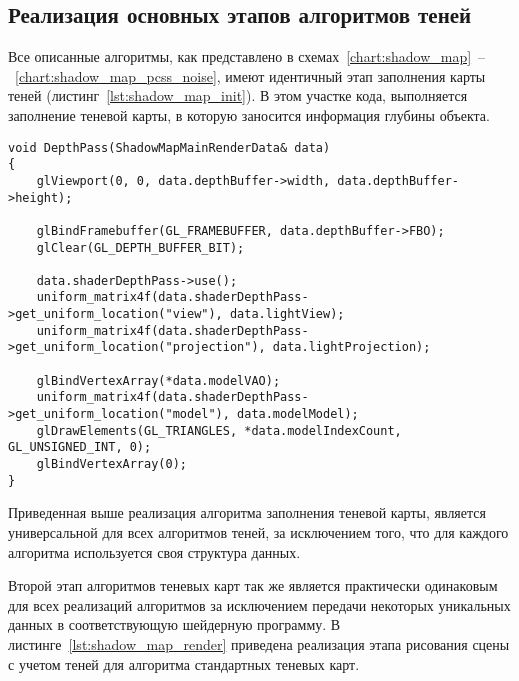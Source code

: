 \subsection{Реализация основных этапов алгоритмов теней}

Все описанные алгоритмы, как представлено в
схемах~\ref{chart:shadow_map}~--~\ref{chart:shadow_map_pcss_noise},
имеют идентичный этап заполнения карты теней (листинг~\ref{lst:shadow_map_init}).
В этом участке кода, выполняется заполнение теневой карты, в которую заносится
информация глубины объекта.

\begin{center}
\captionsetup{justification=centering, singlelinecheck=off}
\begin{lstlisting}[label=lst:shadow_map_init, caption=Алгоритм заполнения теневой карты]
void DepthPass(ShadowMapMainRenderData& data)
{
    glViewport(0, 0, data.depthBuffer->width, data.depthBuffer->height);

    glBindFramebuffer(GL_FRAMEBUFFER, data.depthBuffer->FBO);
    glClear(GL_DEPTH_BUFFER_BIT);

    data.shaderDepthPass->use();
    uniform_matrix4f(data.shaderDepthPass->get_uniform_location("view"), data.lightView);
    uniform_matrix4f(data.shaderDepthPass->get_uniform_location("projection"), data.lightProjection);

    glBindVertexArray(*data.modelVAO);
    uniform_matrix4f(data.shaderDepthPass->get_uniform_location("model"), data.modelModel);
    glDrawElements(GL_TRIANGLES, *data.modelIndexCount, GL_UNSIGNED_INT, 0);
    glBindVertexArray(0);
}
\end{lstlisting}
\end{center}

Приведенная выше реализация алгоритма заполнения теневой карты, является универсальной для
всех алгоритмов теней, за исключением того, что для каждого алгоритма используется
своя структура данных.

Второй этап алгоритмов теневых карт так же является практически одинаковым для всех реализаций
алгоритмов за исключением передачи некоторых уникальных данных в соответствующую шейдерную
программу. В листинге~\ref{lst:shadow_map_render} приведена реализация этапа рисования сцены с учетом теней для
алгоритма стандартных теневых карт.

